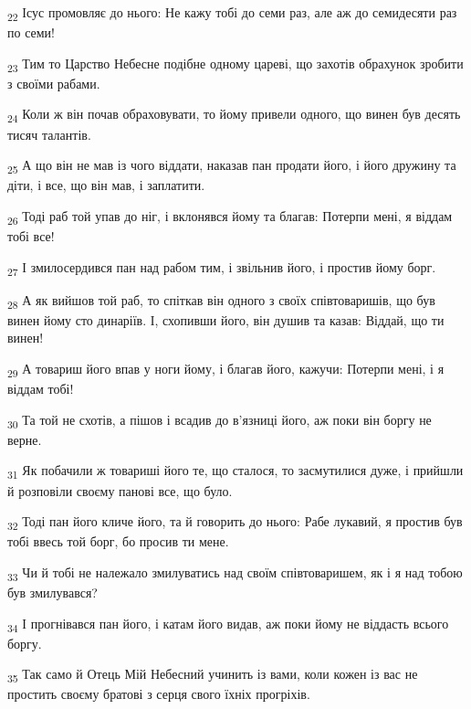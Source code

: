 \begin{tcolorbox}
\textsubscript{22} Ісус промовляє до нього: Не кажу тобі до семи раз, але аж до семидесяти раз по семи!
\end{tcolorbox}
\begin{tcolorbox}
\textsubscript{23} Тим то Царство Небесне подібне одному цареві, що захотів обрахунок зробити з своїми рабами.
\end{tcolorbox}
\begin{tcolorbox}
\textsubscript{24} Коли ж він почав обраховувати, то йому привели одного, що винен був десять тисяч талантів.
\end{tcolorbox}
\begin{tcolorbox}
\textsubscript{25} А що він не мав із чого віддати, наказав пан продати його, і його дружину та діти, і все, що він мав, і заплатити.
\end{tcolorbox}
\begin{tcolorbox}
\textsubscript{26} Тоді раб той упав до ніг, і вклонявся йому та благав: Потерпи мені, я віддам тобі все!
\end{tcolorbox}
\begin{tcolorbox}
\textsubscript{27} І змилосердився пан над рабом тим, і звільнив його, і простив йому борг.
\end{tcolorbox}
\begin{tcolorbox}
\textsubscript{28} А як вийшов той раб, то спіткав він одного з своїх співтоваришів, що був винен йому сто динаріїв. І, схопивши його, він душив та казав: Віддай, що ти винен!
\end{tcolorbox}
\begin{tcolorbox}
\textsubscript{29} А товариш його впав у ноги йому, і благав його, кажучи: Потерпи мені, і я віддам тобі!
\end{tcolorbox}
\begin{tcolorbox}
\textsubscript{30} Та той не схотів, а пішов і всадив до в'язниці його, аж поки він боргу не верне.
\end{tcolorbox}
\begin{tcolorbox}
\textsubscript{31} Як побачили ж товариші його те, що сталося, то засмутилися дуже, і прийшли й розповіли своєму панові все, що було.
\end{tcolorbox}
\begin{tcolorbox}
\textsubscript{32} Тоді пан його кличе його, та й говорить до нього: Рабе лукавий, я простив був тобі ввесь той борг, бо просив ти мене.
\end{tcolorbox}
\begin{tcolorbox}
\textsubscript{33} Чи й тобі не належало змилуватись над своїм співтоваришем, як і я над тобою був змилувався?
\end{tcolorbox}
\begin{tcolorbox}
\textsubscript{34} І прогнівався пан його, і катам його видав, аж поки йому не віддасть всього боргу.
\end{tcolorbox}
\begin{tcolorbox}
\textsubscript{35} Так само й Отець Мій Небесний учинить із вами, коли кожен із вас не простить своєму братові з серця свого їхніх прогріхів.
\end{tcolorbox}
